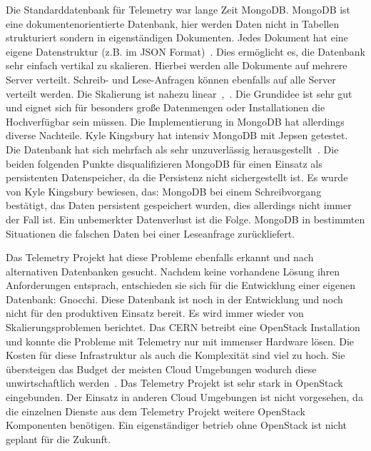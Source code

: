 \begin{outline}
  \1 Die Standarddatenbank für Telemetry war lange Zeit MongoDB\@. MongoDB ist
  eine dokumentenorientierte Datenbank, hier werden Daten nicht in Tabellen
  strukturiert sondern in eigenständigen Dokumenten. Jedes Dokument hat eine
  eigene Datenstruktur (z.B. im \gls{JSON}
  Format)~\cite{Dokumentenorientierte_Datenbank}. Dies ermöglicht es, die
  Datenbank sehr einfach vertikal zu skalieren. Hierbei werden alle Dokumente
  auf mehrere Server verteilt. Schreib- und Lese-Anfragen können ebenfalls auf
  alle Server verteilt werden. Die Skalierung ist nahezu
  linear~\cite{MongoDB_Architecture},~\cite{What_is_MongoDB}. Die Grundidee ist
  sehr gut und eignet sich für besonders große Datenmengen oder Installationen
  die Hochverfügbar sein müssen. Die Implementierung in MongoDB hat allerdings
  diverse Nachteile. Kyle Kingsbury hat intensiv MongoDB mit \gls{Jepsen}
  getestet. Die Datenbank hat sich mehrfach als sehr unzuverlässig
  herausgestellt~\cite{MongoDB_on_Jepsen}. Die beiden folgenden Punkte
  disqualifizieren MongoDB für einen Einsatz als persistenten  Datenspeicher,
  da die Persistenz nicht sichergestellt ist. Es wurde von Kyle Kingsbury
  bewiesen, das:
    \2 MongoDB bei einem Schreibvorgang bestätigt, das Daten persistent
    gespeichert wurden, dies allerdings nicht immer der Fall ist. Ein
    unbemerkter Datenverlust ist die Folge.
    \2 MongoDB in bestimmten Situationen die falschen Daten bei einer
    Leseanfrage zurückliefert.

  \1 Das Telemetry Projekt hat diese Probleme ebenfalls erkannt und nach
  alternativen Datenbanken gesucht. Nachdem keine vorhandene Lösung ihren
  Anforderungen entsprach, entschieden sie sich für die Entwicklung einer
  eigenen Datenbank: \gls{Gnocchi}. Diese Datenbank ist noch in der Entwicklung
  und noch nicht für den produktiven Einsatz bereit.
  \1 Es wird immer wieder von Skalierungsproblemen berichtet. Das CERN betreibt
  eine OpenStack Installation und konnte die Probleme mit Telemetry nur mit
  immenser Hardware lösen. Die Kosten für diese Infrastruktur als auch die
  Komplexität sind viel zu hoch. Sie übersteigen das Budget der meisten Cloud
  Umgebungen wodurch diese unwirtschaftlich werden~\cite{OpenStack_CERN}.
  \1 Das Telemetry Projekt ist sehr stark in OpenStack eingebunden. Der Einsatz
  in anderen Cloud Umgebungen ist nicht vorgesehen, da die einzelnen Dienste
  aus dem Telemetry Projekt weitere OpenStack Komponenten benötigen. Ein
  eigenständiger betrieb ohne OpenStack ist nicht geplant für die Zukunft.
\end{outline}

